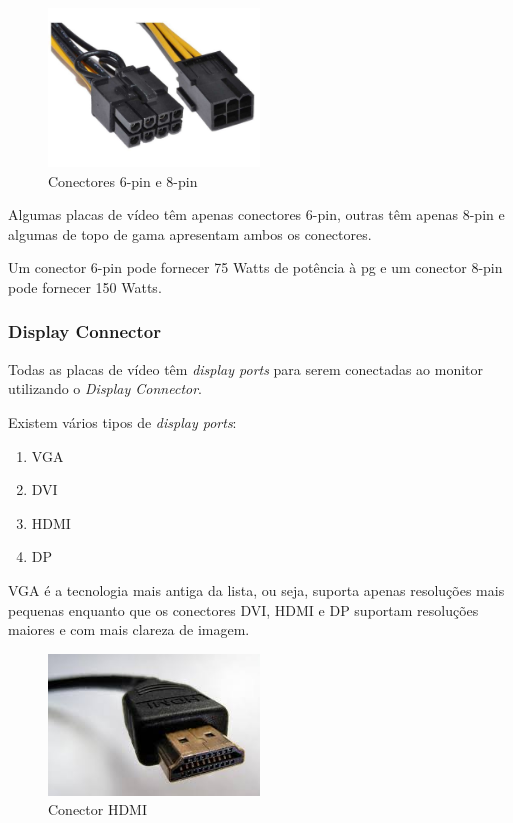 \documentclass{report}
\begin{document}
\begin{figure}[h]
\centering
\includegraphics[width=0.5\textwidth]{6-8-pin.jpg}
\caption{Conectores 6-pin e 8-pin}
\label{fig:pin}
\end{figure}

Algumas placas de vídeo têm apenas conectores 6-pin, outras têm apenas 8-pin e algumas de topo de gama apresentam ambos os conectores.

Um conector 6-pin pode fornecer 75 Watts de potência à \ac{pg} e um conector 8-pin pode fornecer 150 Watts.
\clearpage
\subsubsection{Display Connector}
Todas as placas de vídeo têm \textit{display ports} para serem conectadas ao monitor utilizando o \textit{Display Connector}.

Existem vários tipos de \textit{display ports}:
\begin{enumerate}
  \item VGA
  \item DVI
  \item HDMI
  \item DP 
\end{enumerate}

VGA é a tecnologia mais antiga da lista, ou seja, suporta apenas resoluções mais pequenas enquanto que os conectores DVI, HDMI e DP suportam resoluções maiores e com mais clareza de imagem.

\begin{figure}[h]
\centering
\includegraphics[width=0.5\textwidth]{hdmi.jpg}
\caption{Conector HDMI}
\label{fig:hdmi}
\end{figure}
\clearpage
\end{document}

